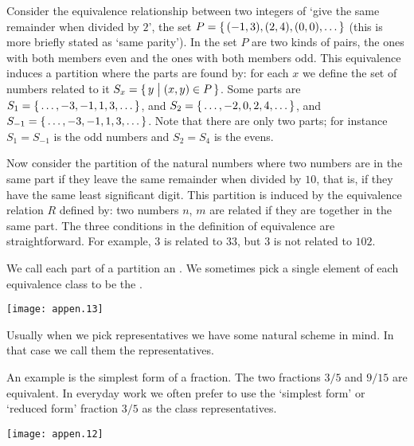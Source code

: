 Consider the equivalence relationship between two integers of 
`give the same remainder when divided by \( 2 \)',
the set \( P=\mbox{$\{\, (-1,3),(2,4),(0,0),\ldots\,\}$} \)
(this is more briefly stated as `same parity').
In the set $P$ are two kinds of pairs, the ones with both members even
and the ones with both members odd.
This equivalence induces a partition where the parts are found by: 
for each \( x \) we define the set of numbers related to
it \( S_x=\mbox{$\{\,y\bigm| (x,y)\in P\,\}$} \).
Some parts are
\( S_1=\mbox{$\{\,\ldots,-3,-1,1,3,\ldots\,\}$} \), and
\( S_2=\mbox{$\{\,\ldots,-2,0,2,4,\ldots\,\}$} \), and
\( S_{-1}=\mbox{$\{\,\ldots,-3,-1,1,3,\ldots\,\}$} \).
Note that there are only two parts; 
for instance \( S_1=S_{-1} \) is the odd numbers and
$S_2=S_4$ is the evens.

Now consider the partition of the natural numbers where
two numbers are in the same part if they leave the same remainder when
divided by $10$, that is, if they have the same least significant digit.
This partition is induced by the equivalence relation $R$ defined by:
two numbers $n$, $m$ are related if they are together in the same part.
The three conditions in the definition of equivalence are straightforward.
For example, $3$ is related to $33$, but $3$ is not related to $102$.

We call each part of a partition an .%
We sometimes pick a single element of each equivalence class to be the 
.%
\begin{center}
  \texttt{[image: appen.13]}
\end{center}
Usually when we pick representatives we have some natural scheme in mind.
In that case we call them the
 representatives.%
%
%

An example is the simplest form of a fraction.
The two fractions \( 3/5 \) and \( 9/15 \) are equivalent.
In everyday work we often prefer to use the `simplest form' or `reduced form'
fraction $3/5$ as the class representatives.
\begin{center}
  \texttt{[image: appen.12]}
\end{center}
%
